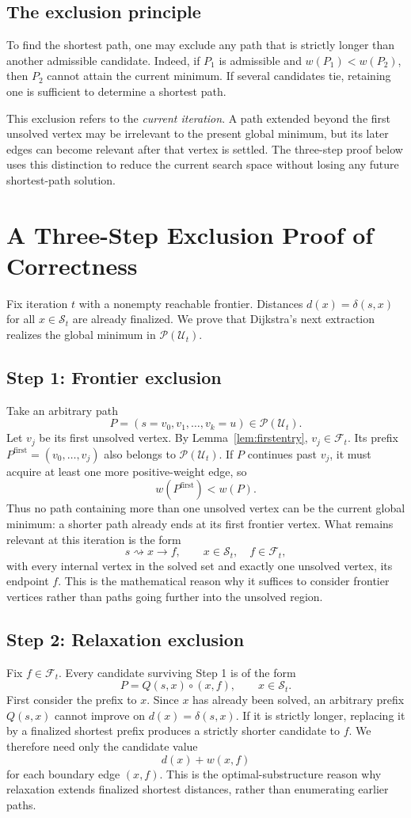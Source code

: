 \documentclass[11pt]{article}
\newcommand{\Sset}{\mathcal{S}_t}
\newcommand{\Fset}{\mathcal{F}_t}
\newcommand{\PathU}{\mathcal{P}(\mathcal{U}_t)}
\begin{document}
\subsection{The exclusion principle}
To find the shortest path, one may exclude any path that is strictly longer than another admissible candidate. Indeed, if $P_1$ is admissible and $w(P_1)<w(P_2)$, then $P_2$ cannot attain the current minimum. If several candidates tie, retaining one is sufficient to determine a shortest path.

This exclusion refers to the \emph{current iteration}. A path extended beyond the first unsolved vertex may be irrelevant to the present global minimum, but its later edges can become relevant after that vertex is settled. The three-step proof below uses this distinction to reduce the current search space without losing any future shortest-path solution.

\section{A Three-Step Exclusion Proof of Correctness}
\label{sec:proof}
Fix iteration $t$ with a nonempty reachable frontier. Distances $d(x)=\delta(s,x)$ for all $x\in\Sset$ are already finalized. We prove that Dijkstra's next extraction realizes the global minimum in $\PathU$.

\subsection{Step 1: Frontier exclusion}
Take an arbitrary path
\[
  P=(s=v_0,v_1,\ldots,v_k=u)\in\PathU.
\]
Let $v_j$ be its first unsolved vertex. By Lemma~\ref{lem:firstentry}, $v_j\in\Fset$. Its prefix $P^{\mathrm{first}}=(v_0,\ldots,v_j)$ also belongs to $\PathU$. If $P$ continues past $v_j$, it must acquire at least one more positive-weight edge, so
\[
  w(P^{\mathrm{first}})<w(P).
\]
Thus no path containing more than one unsolved vertex can be the current global minimum: a shorter path already ends at its first frontier vertex. What remains relevant at this iteration is the form
\[
  s\rightsquigarrow x\to f,
  \qquad x\in\Sset,\quad f\in\Fset,
\]
with every internal vertex in the solved set and exactly one unsolved vertex, its endpoint $f$. This is the mathematical reason why it suffices to consider frontier vertices rather than paths going further into the unsolved region.

\subsection{Step 2: Relaxation exclusion}
Fix $f\in\Fset$. Every candidate surviving Step 1 is of the form
\[
  P=Q(s,x)\circ(x,f),\qquad x\in\Sset.
\]
First consider the prefix to $x$. Since $x$ has already been solved, an arbitrary prefix $Q(s,x)$ cannot improve on $d(x)=\delta(s,x)$. If it is strictly longer, replacing it by a finalized shortest prefix produces a strictly shorter candidate to $f$. We therefore need only the candidate value
\[
  d(x)+w(x,f)
\]
for each boundary edge $(x,f)$. This is the optimal-substructure reason why relaxation extends finalized shortest distances, rather than enumerating earlier paths.
\end{document}
